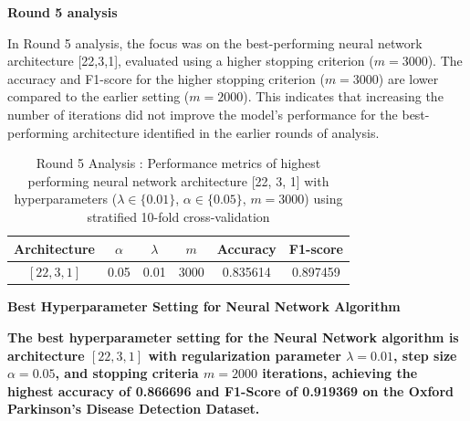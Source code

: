 \documentclass{article}
\begin{document}
\begin{enumerate}
\begin{table}[H]
\caption{Round 4 Analysis : Performance metrics of top performing neural network architectures ($\lambda \in \{0.01, 0.0\}$, $\alpha \in \{0.1, 0.025, 0.075, 0.01\}$, $m = 2000$) using stratified 10-fold cross-validation}
\end{table}

\textbf{Round 5 analysis}

In Round 5 analysis, the focus was on the best-performing neural network architecture [22,3,1], evaluated using a higher stopping criterion ($m = 3000$). The accuracy and F1-score for the higher stopping criterion ($m = 3000$) are lower compared to the earlier setting ($m = 2000$). This indicates that increasing the number of iterations did not improve the model’s performance for the best-performing architecture identified in the earlier rounds of analysis.

\begin{table}[H]
\centering
\large
\renewcommand{\arraystretch}{1.3}
\setlength{\tabcolsep}{8pt}

\begin{tabular}{|c|c|c|c|c|c|}
\hline
\textbf{Architecture} & \textbf{$\alpha$} & \textbf{$\lambda$} & \textbf{$m$} & \textbf{Accuracy} & \textbf{F1-score} \\
\hline

$[22,3,1]$ & 0.05 & 0.01 & 3000 & 0.835614 & 0.897459 \\ \hline

\end{tabular}

\caption{Round 5 Analysis : Performance metrics of highest performing neural network architecture [22, 3, 1] with hyperparameters ($\lambda \in \{0.01\}$, $\alpha \in \{0.05\}$, $m = 3000$) using stratified 10-fold cross-validation}
\end{table}

\large{\textbf{Best Hyperparameter Setting for Neural Network Algorithm}} \\

\vspace{0.3cm}

\textbf{The best hyperparameter setting for the Neural Network algorithm is architecture $[22, 3, 1]$ with regularization parameter $\lambda = 0.01$, step size $\alpha = 0.05$, and stopping criteria
$m = 2000$ iterations, achieving the highest accuracy of \textbf{0.866696} and F1-Score of \textbf{0.919369} on the Oxford Parkinson's Disease Detection Dataset.}


\end{enumerate}
\end{document}
